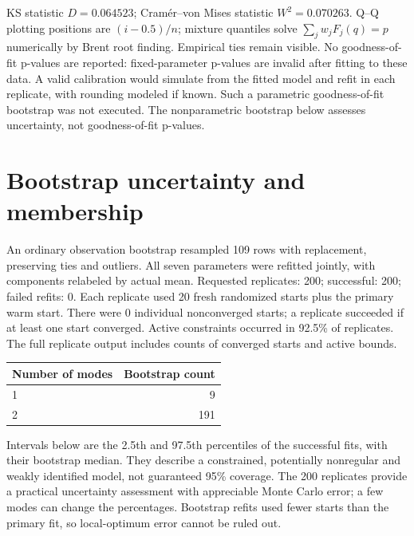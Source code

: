\documentclass[11pt,a4paper]{article}
\begin{document}
KS statistic $D=0.064523$; Cram\'er--von Mises statistic $W^2=0.070263$. Q--Q plotting positions are $(i-0.5)/n$; mixture quantiles solve $\sum_jw_jF_j(q)=p$ numerically by Brent root finding. Empirical ties remain visible. No goodness-of-fit p-values are reported: fixed-parameter p-values are invalid after fitting to these data. A valid calibration would simulate from the fitted model and refit in each replicate, with rounding modeled if known. Such a parametric goodness-of-fit bootstrap was not executed. The nonparametric bootstrap below assesses uncertainty, not goodness-of-fit p-values.

\clearpage\section*{Bootstrap uncertainty and membership}
An ordinary observation bootstrap resampled 109 rows with replacement, preserving ties and outliers. All seven parameters were refitted jointly, with components relabeled by actual mean. Requested replicates: 200; successful: 200; failed refits: 0. Each replicate used 20 fresh randomized starts plus the primary warm start. There were 0 individual nonconverged starts; a replicate succeeded if at least one start converged. Active constraints occurred in 92.5\% of replicates. The full replicate output includes counts of converged starts and active bounds.

\begin{center}
\small
\begin{tabular}{lr}
\toprule
Number of modes & Bootstrap count\\
\midrule
1 & 9\\
2 & 191\\
\bottomrule
\end{tabular}
\end{center}
Intervals below are the 2.5th and 97.5th percentiles of the successful fits, with their bootstrap median. They describe a constrained, potentially nonregular and weakly identified model, not guaranteed 95\% coverage. The 200 replicates provide a practical uncertainty assessment with appreciable Monte Carlo error; a few modes can change the percentages. Bootstrap refits used fewer starts than the primary fit, so local-optimum error cannot be ruled out.
\end{document}
